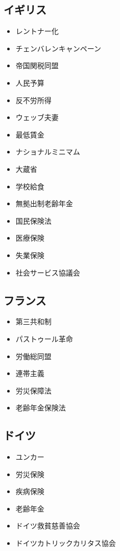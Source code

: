 \documentclass{jsarticle}
\begin{document}
\subsection{イギリス}
\begin{itemize}
	\item レントナー化
	\item チェンバレンキャンペーン
	\item 帝国関税同盟
	\item 人民予算
	\item 反不労所得
	\item ウェッブ夫妻
	\item 最低賃金
	\item ナショナルミニマム
	\item 大蔵省
	\item 学校給食
	\item 無拠出制老齢年金
	\item 国民保険法
	\item 医療保険
	\item 失業保険
	\item 社会サービス協議会
\end{itemize}

\subsection{フランス}
\begin{itemize}
	\item 第三共和制
	\item パストゥール革命
	\item 労働総同盟
	\item 連帯主義
	\item 労災保障法
	\item 老齢年金保険法
\end{itemize}

\subsection{ドイツ}
\begin{itemize}
	\item ユンカー
	\item 労災保険
	\item 疾病保険
	\item 老齢年金
	\item ドイツ救貧慈善協会
	\item ドイツカトリックカリタス協会
\end{itemize}
\end{document}
